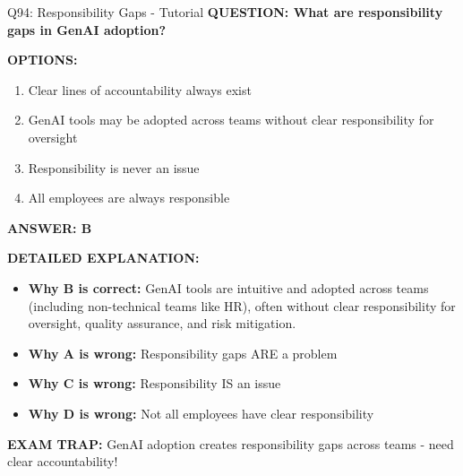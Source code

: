 \documentclass[8pt]{beamer}
\begin{document}
	\begin{frame}{Q94: Responsibility Gaps - Tutorial}
		\fontsize{6.5}{7.5}\selectfont
		\textbf{QUESTION: What are responsibility gaps in GenAI adoption?}
		
		\vspace{0.1cm}
		\textbf{OPTIONS:}
		\begin{enumerate}
			\item Clear lines of accountability always exist
			\item GenAI tools may be adopted across teams without clear responsibility for oversight
			\item Responsibility is never an issue
			\item All employees are always responsible
		\end{enumerate}
		
		\vspace{0.1cm}
		\textcolor{myblue}{\textbf{ANSWER: B}}
		
		\vspace{0.1cm}
		\textbf{DETAILED EXPLANATION:}
		\begin{itemize}
			\item \textbf{Why B is correct:} GenAI tools are intuitive and adopted across teams (including non-technical teams like HR), often without clear responsibility for oversight, quality assurance, and risk mitigation.
			\item \textbf{Why A is wrong:} Responsibility gaps ARE a problem
			\item \textbf{Why C is wrong:} Responsibility IS an issue
			\item \textbf{Why D is wrong:} Not all employees have clear responsibility
		\end{itemize}
		
		\textcolor{myred}{\textbf{EXAM TRAP:}} GenAI adoption creates \textcolor{myblue}{responsibility gaps} across teams - need clear accountability!
	\end{frame}
	
\end{document}
